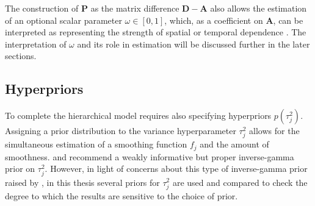 The construction of $\mathbf{P}$ as the matrix difference $\mathbf{D} - \mathbf{A}$ also allows the estimation of an optional scalar parameter $\omega \in [0,1]$, which, as a coefficient on $\mathbf{A}$, can be interpreted as representing the strength of spatial or temporal dependence . The interpretation of $\omega$ and its role in estimation will be discussed further in the later sections. 


\subsection{Hyperpriors}
\label{hyperpriors}

To complete the hierarchical model requires also specifying hyperpriors $p(\tau_j^2)$.  Assigning a prior distribution to the variance hyperparameter $\tau_j^2$ allows for the simultaneous estimation of a smoothing function $f_j$ and the amount of smoothness.  and  recommend a weakly informative but proper inverse-gamma prior on $\tau_j^2$. However, in light of concerns about this type of inverse-gamma prior raised by , in this thesis several priors for $\tau^2_j$ are used and compared to check the degree to which the results are sensitive to the choice of prior.

